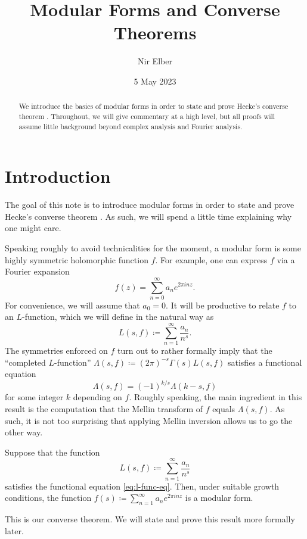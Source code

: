 \documentclass{amsart}
\title{Modular Forms and Converse Theorems}
\author{Nir Elber}
\date{5 May 2023}
\begin{document}
\begin{abstract}
	\noindent We introduce the basics of modular forms in order to state and prove Hecke's converse theorem \cite{hecke-converse}. Throughout, we will give commentary at a high level, but all proofs will assume little background beyond complex analysis and Fourier analysis.
\end{abstract}

\maketitle

\setcounter{tocdepth}{2}
\tableofcontents

\section{Introduction}
The goal of this note is to introduce modular forms in order to state and prove Hecke's converse theorem \cite{hecke-converse}. As such, we will spend a little time explaining why one might care.

Speaking roughly to avoid technicalities for the moment, a modular form is some highly symmetric holomorphic function $f$. For example, one can express $f$ via a Fourier expansion
\[f(z)=\sum_{n=0}^\infty a_ne^{2\pi inz}.\]
For convenience, we will assume that $a_0=0$. It will be productive to relate $f$ to an $L$-function, which we will define in the natural way as
\[L(s,f)\coloneqq\sum_{n=1}^\infty\frac{a_n}{n^s}.\]
The symmetries enforced on $f$ turn out to rather formally imply that the ``completed $L$-function'' $\Lambda(s,f)\coloneqq(2\pi)^{-s}\Gamma(s)L(s,f)$ satisfies a functional equation
\begin{equation}
	\Lambda(s,f)=(-1)^{k/s}\Lambda(k-s,f) \label{eq:l-func-eq}
\end{equation}
for some integer $k$ depending on $f$. Roughly speaking, the main ingredient in this result is the computation that the Mellin transform of $f$ equals $\Lambda(s,f)$. As such, it is not too surprising that applying Mellin inversion allows us to go the other way.
\begin{theorem}[Hecke]
	Suppose that the function
	\[L(s,f)\coloneqq\sum_{n=1}^\infty\frac{a_n}{n^s}\]
	satisfies the functional equation \eqref{eq:l-func-eq}. Then, under suitable growth conditions, the function $f(s)\coloneqq\sum_{n=1}^\infty a_ne^{2\pi inz}$ is a modular form.
\end{theorem}
This is our converse theorem. We will state and prove this result more formally later.\todo{}
\end{document}
